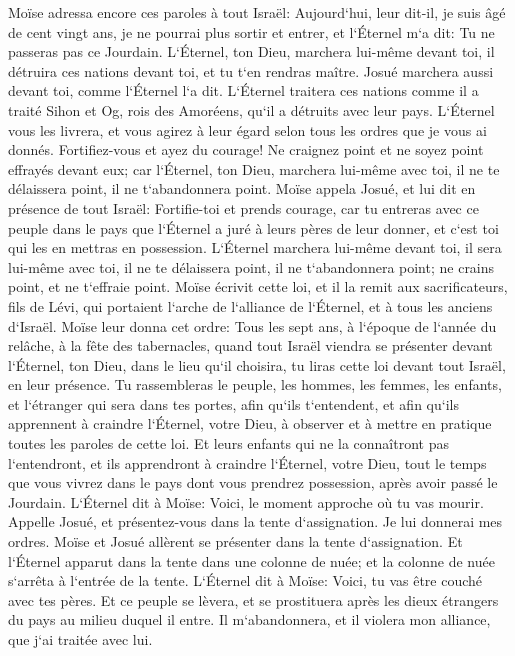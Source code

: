 \verse Moïse adressa encore ces paroles à tout Israël: 
\verse Aujourd`hui, leur dit-il, je suis âgé de cent vingt ans, je ne pourrai plus sortir et entrer, et l`Éternel m`a dit: Tu ne passeras pas ce Jourdain. 
\verse L`Éternel, ton Dieu, marchera lui-même devant toi, il détruira ces nations devant toi, et tu t`en rendras maître. Josué marchera aussi devant toi, comme l`Éternel l`a dit. 
\verse L`Éternel traitera ces nations comme il a traité Sihon et Og, rois des Amoréens, qu`il a détruits avec leur pays. 
\verse L`Éternel vous les livrera, et vous agirez à leur égard selon tous les ordres que je vous ai donnés. 
\verse Fortifiez-vous et ayez du courage! Ne craignez point et ne soyez point effrayés devant eux; car l`Éternel, ton Dieu, marchera lui-même avec toi, il ne te délaissera point, il ne t`abandonnera point. 
\verse Moïse appela Josué, et lui dit en présence de tout Israël: Fortifie-toi et prends courage, car tu entreras avec ce peuple dans le pays que l`Éternel a juré à leurs pères de leur donner, et c`est toi qui les en mettras en possession. 
\verse L`Éternel marchera lui-même devant toi, il sera lui-même avec toi, il ne te délaissera point, il ne t`abandonnera point; ne crains point, et ne t`effraie point. 
\verse Moïse écrivit cette loi, et il la remit aux sacrificateurs, fils de Lévi, qui portaient l`arche de l`alliance de l`Éternel, et à tous les anciens d`Israël. 
\verse Moïse leur donna cet ordre: Tous les sept ans, à l`époque de l`année du relâche, à la fête des tabernacles, 
\verse quand tout Israël viendra se présenter devant l`Éternel, ton Dieu, dans le lieu qu`il choisira, tu liras cette loi devant tout Israël, en leur présence. 
\verse Tu rassembleras le peuple, les hommes, les femmes, les enfants, et l`étranger qui sera dans tes portes, afin qu`ils t`entendent, et afin qu`ils apprennent à craindre l`Éternel, votre Dieu, à observer et à mettre en pratique toutes les paroles de cette loi. 
\verse Et leurs enfants qui ne la connaîtront pas l`entendront, et ils apprendront à craindre l`Éternel, votre Dieu, tout le temps que vous vivrez dans le pays dont vous prendrez possession, après avoir passé le Jourdain. 
\verse L`Éternel dit à Moïse: Voici, le moment approche où tu vas mourir. Appelle Josué, et présentez-vous dans la tente d`assignation. Je lui donnerai mes ordres. Moïse et Josué allèrent se présenter dans la tente d`assignation. 
\verse Et l`Éternel apparut dans la tente dans une colonne de nuée; et la colonne de nuée s`arrêta à l`entrée de la tente. 
\verse L`Éternel dit à Moïse: Voici, tu vas être couché avec tes pères. Et ce peuple se lèvera, et se prostituera après les dieux étrangers du pays au milieu duquel il entre. Il m`abandonnera, et il violera mon alliance, que j`ai traitée avec lui. 

